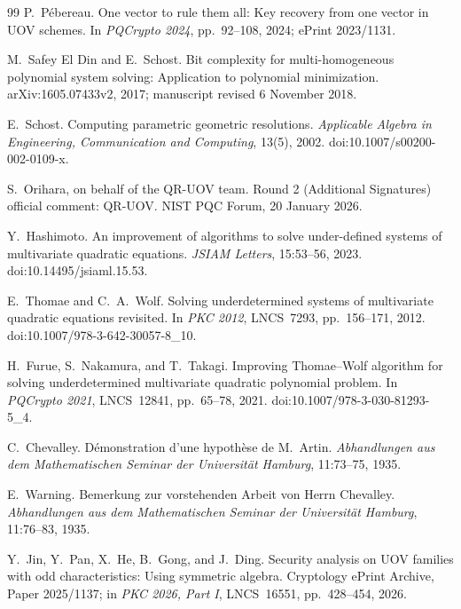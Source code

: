 \documentclass[11pt,a4paper]{article}
\theoremstyle{definition}
\theoremstyle{remark}
\begin{document}
\begin{thebibliography}{99}
P.~P\'ebereau.
\newblock One vector to rule them all: Key recovery from one vector in UOV schemes.
\newblock In \emph{PQCrypto 2024}, pp.~92--108, 2024; ePrint 2023/1131.


M.~Safey El Din and E.~Schost.
\newblock Bit complexity for multi-homogeneous polynomial system solving: Application to polynomial minimization.
\newblock arXiv:1605.07433v2, 2017; manuscript revised 6 November 2018.

E.~Schost.
\newblock Computing parametric geometric resolutions.
\newblock \emph{Applicable Algebra in Engineering, Communication and Computing}, 13(5), 2002.
\newblock doi:10.1007/s00200-002-0109-x.

S.~Orihara, on behalf of the QR-UOV team.
\newblock Round 2 (Additional Signatures) official comment: QR-UOV.
\newblock NIST PQC Forum, 20 January 2026.

Y.~Hashimoto.
\newblock An improvement of algorithms to solve under-defined systems of multivariate quadratic equations.
\newblock \emph{JSIAM Letters}, 15:53--56, 2023.
\newblock doi:10.14495/jsiaml.15.53.

E.~Thomae and C.~A.~Wolf.
\newblock Solving underdetermined systems of multivariate quadratic equations revisited.
\newblock In \emph{PKC 2012}, LNCS~7293, pp.~156--171, 2012.
\newblock doi:10.1007/978-3-642-30057-8\_10.

H.~Furue, S.~Nakamura, and T.~Takagi.
\newblock Improving Thomae--Wolf algorithm for solving underdetermined multivariate quadratic polynomial problem.
\newblock In \emph{PQCrypto 2021}, LNCS~12841, pp.~65--78, 2021.
\newblock doi:10.1007/978-3-030-81293-5\_4.

C.~Chevalley.
\newblock D\'emonstration d'une hypoth\`ese de M.~Artin.
\newblock \emph{Abhandlungen aus dem Mathematischen Seminar der Universit\"at Hamburg}, 11:73--75, 1935.

E.~Warning.
\newblock Bemerkung zur vorstehenden Arbeit von Herrn Chevalley.
\newblock \emph{Abhandlungen aus dem Mathematischen Seminar der Universit\"at Hamburg}, 11:76--83, 1935.

Y.~Jin, Y.~Pan, X.~He, B.~Gong, and J.~Ding.
\newblock Security analysis on UOV families with odd characteristics: Using symmetric algebra.
\newblock Cryptology ePrint Archive, Paper 2025/1137; in \emph{PKC 2026, Part I}, LNCS~16551, pp.~428--454, 2026.

\end{thebibliography}
\end{document}
